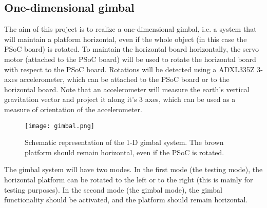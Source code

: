 \subsection{One-dimensional gimbal}

The aim of this project is to realize a one-dimensional gimbal, i.e. a system that will maintain a platform horizontal, even if the whole object (in this case the PSoC board) is rotated. To maintain the horizontal board horizontally, the servo motor (attached to the PSoC board) will be used to rotate the horizontal board with respect to the PSoC board. Rotations will be detected using a ADXL335Z 3-axes accelerometer, which can be attached to the PSoC board or to the horizontal board. Note that an accelerometer will measure the earth's vertical gravitation vector and project it along it's 3 axes, which can be used as a measure of orientation of the accelerometer. 
\begin{figure}[h]
	\centering
	\texttt{[image: gimbal.png]}
	\caption{Schematic representation of the 1-D gimbal system. The brown platform should remain horizontal, even if the PSoC is rotated. }
	\label{fig:gimbal}
\end{figure}
The gimbal system will have two modes. In the first mode (the testing mode), the horizontal platform can be rotated to the left or to the right (this is mainly for testing purposes). In the second mode (the gimbal mode), the gimbal functionality should be activated, and the platform should remain horizontal. 

